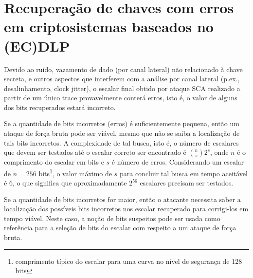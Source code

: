 
\section{Recuperação de chaves com erros em criptosistemas baseados no (EC)DLP}

%
Devido ao ruído, vazamento de dado (por canal lateral) não relacionado à chave secreta, e outros aspectos que interferem com a análise por canal lateral (p.ex., desalinhamento, clock jitter), o escalar final obtido por ataque SCA realizado a partir de um único trace provavelmente conterá erros, isto é, o valor de alguns dos bits recuperados estará incorreto.

%
%
Se a quantidade de bits incorretos (erros) é suficientemente pequena, então um ataque de força bruta pode ser viável, mesmo que não se saiba a localização de tais bits incorretos. A complexidade de tal busca, isto é, o número de escalares que devem ser testados até o escalar correto ser encontrado é ${{n}\choose{s}} 2^s$, onde $n$ é o comprimento do escalar em bits e $s$ é número de erros. Considerando um escalar de $n = 256$ bits\footnote{comprimento típico do escalar para uma curva no nível de segurança de 128 bits}, o valor máximo de $s$ para concluir tal busca em tempo aceitável é 6, o que significa que aproximadamente $2^{56}$ escalares precisam ser testados.

%
%
Se a quantidade de bits incorretos for maior, então o atacante necessita saber a localização dos possíveis bits incorretos nos escalar recuperado para corrigi-los em tempo viável.
%
%
Neste caso, a noção de bits suspeitos pode ser usada como referência para a seleção de bits do escalar com respeito a um ataque de força bruta.
%

\newcommand{\iterations}{254}

